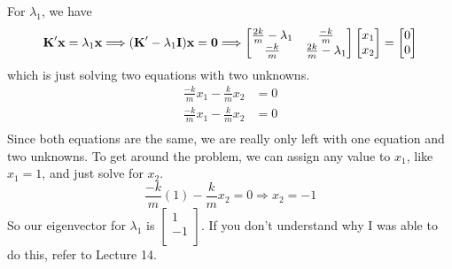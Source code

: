 \documentclass{article}
\newcommand{\be}{\begin{equation}}
\newcommand{\ee}{\end{equation}}
\newcommand{\bK}{\mbox{\bf K}}
\begin{document}
For $\lambda_1$, we have
\be
  \bK' \textbf{x} = \lambda_1 \textbf{x} \Longrightarrow (\bK' - \lambda_1 \textbf{I}) \textbf{x} = \textbf{0} \Longrightarrow
  \begin{bmatrix}
    \frac{2k}{m} - \lambda_1 & \frac{-k}{m} \\
    \frac{-k}{m} & \frac{2k}{m} - \lambda_1 \\
  \end{bmatrix}
  \begin{bmatrix}
    x_1 \\
    x_2 \\
  \end{bmatrix}
  =
  \begin{bmatrix}
    0 \\
    0 \\
  \end{bmatrix}
\ee
which is just solving two equations with two unknowns.
\be
  \begin{split}
    \frac{-k}{m}x_1 - \frac{k}{m}x_2 &= 0 \\
    \frac{-k}{m}x_1 - \frac{k}{m}x_2 &= 0 \\
  \end{split}
\ee
Since both equations are the same, we are really only left with one equation and two unknowns. To get around the problem, we can assign any value to $x_1$, like $x_1 = 1$, and just solve for $x_2$.
\be
  \frac{-k}{m}(1) - \frac{k}{m}x_2 = 0 \Longrightarrow x_2 = -1
\ee
So our eigenvector for $\lambda_1$ is $\begin{bmatrix} 1 \\ -1 \\ \end{bmatrix}$. If you don't understand why I was able to do this, refer to Lecture 14.
\end{document}
